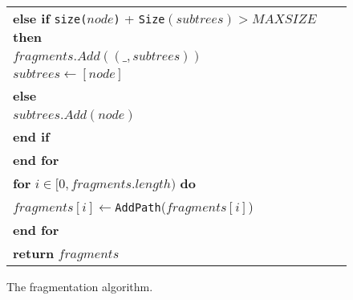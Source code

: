 \begin{figure}[]
\begin{tabular}{l}
		\makebox[1em][r]{10:}\hspace{5 mm}  \textbf{else if} \texttt{size($node$)} + \texttt{Size}$(subtrees) > \mathit{MAXSIZE}$ \textbf{then} \\
		\makebox[1em][r]{11:}\hspace{9 mm} $\mathit{fragments}.Add((\_, subtrees))$ \\
		\makebox[1em][r]{12:}\hspace{9 mm} $subtrees \leftarrow [node]$ \\
		\makebox[1em][r]{13:}\hspace{5 mm}  \textbf{else}\\
		\makebox[1em][r]{14:}\hspace{9 mm} $\mathit{subtrees}.Add(node)$ \\
		\makebox[1em][r]{15:}\hspace{5 mm}  \textbf{end if}\\
		\makebox[1em][r]{16:}\hspace{1 mm}  \textbf{end for}\\
		\makebox[1em][r]{17:}\hspace{1 mm}  \textbf{for} $i \in [0, \mathit{fragments}.length)$ \textbf{do}\\
		\makebox[1em][r]{18:}\hspace{5 mm}  $\mathit{fragments}[i] \leftarrow $\texttt{AddPath}($\mathit{fragments}[i]$)  \\
		\makebox[1em][r]{19:}\hspace{1 mm}  \textbf{end for}\\
		\makebox[1em][r]{20:}\hspace{1 mm}  \textbf{return} $\mathit{fragments}$\\
		\hline
	\end{tabular}
	\caption{The fragmentation algorithm.}
	\label{fig:algQuery1}
\end{figure}


